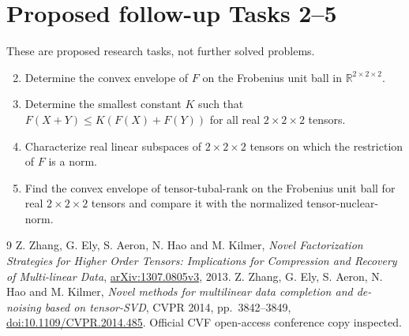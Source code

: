 \documentclass[11pt]{article}
\begin{document}
\section*{Proposed follow-up Tasks 2--5}
These are proposed research tasks, not further solved problems.
\begin{enumerate}
\setcounter{enumi}{1}
\item Determine the convex envelope of $F$ on the Frobenius unit ball
in $\mathbb R^{2\times2\times2}$.
\item Determine the smallest constant $K$ such that
$F(X+Y)\leq K(F(X)+F(Y))$ for all real $2\times2\times2$ tensors.
\item Characterize real linear subspaces of $2\times2\times2$ tensors
on which the restriction of $F$ is a norm.
\item Find the convex envelope of tensor-tubal-rank on the Frobenius
unit ball for real $2\times2\times2$ tensors and compare it with
the normalized tensor-nuclear-norm.
\end{enumerate}

\begin{thebibliography}{9}
 Z. Zhang, G. Ely, S. Aeron, N. Hao and M. Kilmer,
\emph{Novel Factorization Strategies for Higher Order Tensors:
Implications for Compression and Recovery of Multi-linear Data},
\href{https://arxiv.org/abs/1307.0805v3}{arXiv:1307.0805v3}, 2013.
 Z. Zhang, G. Ely, S. Aeron, N. Hao and M. Kilmer,
\emph{Novel methods for multilinear data completion and de-noising
based on tensor-SVD}, CVPR 2014, pp.~3842--3849,
\href{https://doi.org/10.1109/CVPR.2014.485}{doi:10.1109/CVPR.2014.485}.
Official CVF open-access conference copy inspected.
\end{thebibliography}
\end{document}
